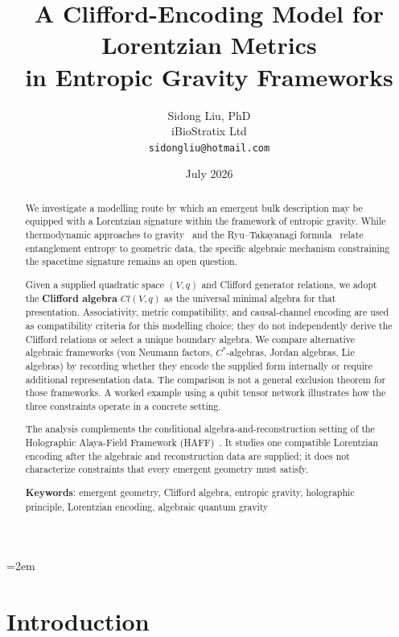 \documentclass[12pt]{article}
\title{A Clifford-Encoding Model for Lorentzian Metrics\\
in Entropic Gravity Frameworks}
\author{Sidong Liu, PhD \\
\small iBioStratix Ltd \\
\small \texttt{sidongliu@hotmail.com}}
\date{July 2026}
\begin{document}
\emergencystretch=2em
\raggedbottom
{}
\maketitle

\begin{abstract}
We investigate a modelling route by which an emergent bulk description may be equipped with a Lorentzian signature within the framework of entropic gravity.
While thermodynamic approaches to gravity~\cite{Jacobson1995,Verlinde2011} and the Ryu--Takayanagi formula~\cite{RyuTakayanagi2006} relate entanglement entropy to geometric data, the specific algebraic mechanism constraining the spacetime signature remains an open question.

Given a supplied quadratic space $(V,q)$ and Clifford generator relations, we adopt the \textbf{Clifford algebra} $Cl(V,q)$ as the universal minimal algebra for that presentation.  Associativity, metric compatibility, and causal-channel encoding are used as compatibility criteria for this modelling choice; they do not independently derive the Clifford relations or select a unique boundary algebra.
We compare alternative algebraic frameworks (von Neumann factors, $C^*$-algebras, Jordan algebras, Lie algebras) by recording whether they encode the supplied form internally or require additional representation data.  The comparison is not a general exclusion theorem for those frameworks.
A worked example using a qubit tensor network illustrates how the three constraints operate in a concrete setting.

The analysis complements the conditional algebra-and-reconstruction setting of the Holographic Alaya-Field Framework (HAFF)~\cite{Liu2026PaperA,Liu2026PaperB}.  It studies one compatible Lorentzian encoding after the algebraic and reconstruction data are supplied; it does not characterize constraints that every emergent geometry must satisfy.

\medskip
\noindent\textbf{Keywords}: emergent geometry, Clifford algebra, entropic gravity, holographic principle, Lorentzian encoding, algebraic quantum gravity
\end{abstract}

\section{Introduction}
\label{sec:intro}
\end{document}

